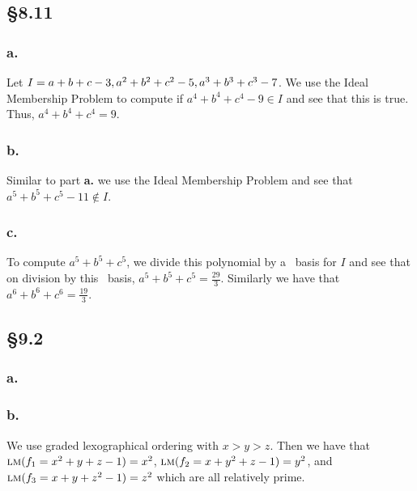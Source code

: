 \documentclass[letterpaper]{article}
\begin{document}
\subsection*{\S 8.11}

\subsubsection*{a.}

Let $I = \gen{a + b + c - 3, a^{2} + b^{2} + c^{2} - 5, a^{3} + b^{3} + c^{3} - 7}$.
We use the Ideal Membership Problem to compute if $a^{4} + b^{4} + c^{4} - 9 \in I$ and see that this is true.
Thus, $a^{4} + b^{4} + c^{4} = 9$.

\subsubsection*{b.}

Similar to part \textbf{a.} we use the Ideal Membership Problem and see that $a^{5} + b^{5} + c^{5} - 11 \notin I$.

\subsubsection*{c.}

To compute $a^{5} + b^{5} + c^{5}$, we divide this polynomial by a \Grobner\ basis for $I$ and see that on division by this \Grobner\ basis, $a^{5} + b^{5} + c^{5} = \frac{29}{3}$.
Similarly we have that $a^{6} + b^{6} + c^{6} = \frac{19}{3}$.

\subsection*{\S 9.2}

\subsubsection*{a.}


\subsubsection*{b.}

We use graded lexographical ordering with $x > y > z$.
Then we have that $\operatorname{\textsc{lm}}(f_{1} = x^{2} + y + z - 1) = x^{2}$, $\operatorname{\textsc{lm}}(f_{2} = x + y^{2} + z - 1) = y^{2}$, and $\operatorname{\textsc{lm}}(f_{3} = x + y + z^{2} - 1) = z^{2}$ which are all relatively prime.
\end{document}
